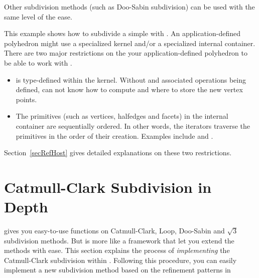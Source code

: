 Other subdivision methods (such as Doo-Sabin subdivision) can be
used with the same level of the ease.

This example shows how to subdivide a simple 
with .
An application-defined polyhedron might use a specialized kernel and/or
a specialized internal container. There are two major restrictions on the 
your application-defined polyhedron to be able to work with 
.
\begin{itemize}
\item
{} is type-defined within the kernel. Without  
and associated operations being defined,  
can not know how to compute and where to store the new vertex points.
\item
The primitives (such as vertices, halfedges and facets) 
in the internal container are sequentially ordered. 
In other words, the iterators traverse the primitives in 
the order of their creation. Examples include  and 
.

\end{itemize}

Section~\ref{secRefHost} gives detailed explanations on these 
two restrictions.

\section{Catmull-Clark Subdivision in Depth}
\label{secCC}
 gives you easy-to-use functions on 
Catmull-Clark, Loop, Doo-Sabin and $\sqrt{3}$ subdivision methods.
But  is more like a framework that let 
you extend the methods with ease. This section explains the process
of \emph{implementing} the Catmull-Clark subdivision within
. Following this procedure, you can 
easily implement a new subdivision method based on the refinement 
patterns in 

